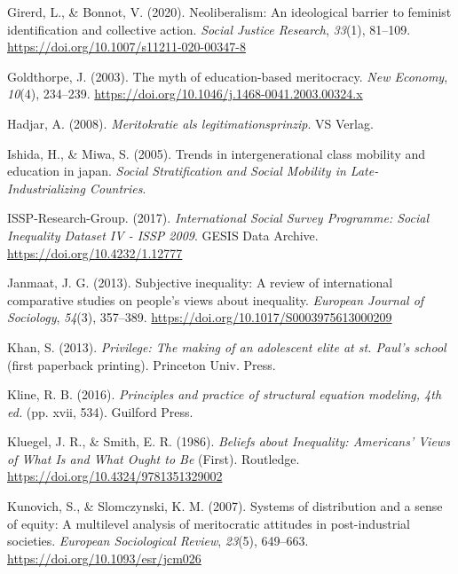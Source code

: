 \documentclass[
  10pt,
  a4paper,
]{article}
\newlength{\cslhangindent}
\newenvironment{CSLReferences}[2] %
 {\begin{list}{}{%
  \setlength{\itemindent}{0pt}
  \setlength{\leftmargin}{0pt}
  \setlength{\parsep}{0pt}
  \ifodd #1
   \setlength{\leftmargin}{\cslhangindent}
   \setlength{\itemindent}{-1\cslhangindent}
  \fi
  \setlength{\itemsep}{#2\baselineskip}}}
 {\end{list}}
\begin{document}
\begin{CSLReferences}{1}{0}
Girerd, L., \& Bonnot, V. (2020). Neoliberalism: {An} ideological barrier to feminist identification and collective action. \emph{Social Justice Research}, \emph{33}(1), 81--109. \url{https://doi.org/10.1007/s11211-020-00347-8}

Goldthorpe, J. (2003). The myth of education-based meritocracy. \emph{New Economy}, \emph{10}(4), 234--239. \url{https://doi.org/10.1046/j.1468-0041.2003.00324.x}

Hadjar, A. (2008). \emph{Meritokratie als legitimationsprinzip}. {VS Verlag}.

Ishida, H., \& Miwa, S. (2005). Trends in intergenerational class mobility and education in japan. \emph{Social Stratification and Social Mobility in Late-Industrializing Countries}.

ISSP-Research-Group. (2017). \emph{International {Social Survey Programme}: {Social Inequality Dataset IV} - {ISSP} 2009}. {GESIS Data Archive}. \url{https://doi.org/10.4232/1.12777}

Janmaat, J. G. (2013). Subjective inequality: A review of international comparative studies on people's views about inequality. \emph{European Journal of Sociology}, \emph{54}(3), 357--389. \url{https://doi.org/10.1017/S0003975613000209}

Khan, S. (2013). \emph{Privilege: {The} making of an adolescent elite at st. {Paul}'s school} (first paperback printing). {Princeton Univ. Press}.

Kline, R. B. (2016). \emph{Principles and practice of structural equation modeling, 4th ed.} (pp. xvii, 534). {Guilford Press}.

Kluegel, J. R., \& Smith, E. R. (1986). \emph{Beliefs about {Inequality}: {Americans}' {Views} of {What Is} and {What Ought} to {Be}} (First). {Routledge}. \url{https://doi.org/10.4324/9781351329002}

Kunovich, S., \& Slomczynski, K. M. (2007). Systems of distribution and a sense of equity: {A} multilevel analysis of meritocratic attitudes in post-industrial societies. \emph{European Sociological Review}, \emph{23}(5), 649--663. \url{https://doi.org/10.1093/esr/jcm026}


\end{CSLReferences}
\end{document}
